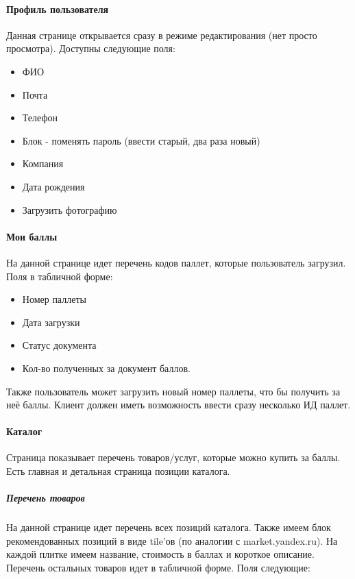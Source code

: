 \documentclass[DIV=calc, paper=a4, fontsize=11pt]{scrartcl} %
\begin{document}
\paragraph{Профиль пользователя}

Данная странице открывается сразу в режиме редактирования (нет просто просмотра). Доступны следующие поля:

\begin{itemize}
	\item ФИО
	\item Почта
	\item Телефон
	\item Блок - поменять пароль (ввести старый, два раза новый)
	\item Компания
	\item Дата рождения
	\item Загрузить фотографию
\end{itemize}

\paragraph{Мои баллы}

На данной странице идет перечень кодов паллет, которые пользователь загрузил. Поля в табличной форме:

\begin{itemize}
	\item Номер паллеты
	\item Дата загрузки
	\item Статус документа
	\item Кол-во полученных за документ баллов.
\end{itemize}

Также пользователь может загрузить новый номер паллеты, что бы получить за неё баллы. Клиент должен иметь возможность ввести сразу несколько ИД паллет.

\paragraph{Каталог}

Страница показывает перечень товаров/услуг, которые можно купить за баллы. Есть главная и детальная страница позиции каталога.

\subparagraph{Перечень товаров}
На данной странице идет перечень всех позиций каталога.
Также имеем блок рекомендованных позиций в виде tile'ов (по аналогии с market.yandex.ru). На каждой плитке имеем название, стоимость в баллах и короткое описание.
\\[0.5cm]
Перечень остальных товаров идет в табличной форме. Поля следующие:
\end{document}
